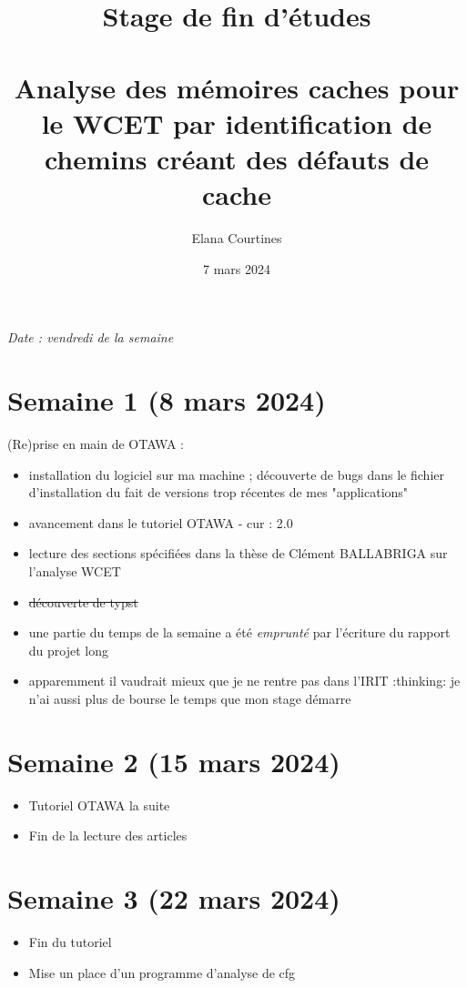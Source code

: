\documentclass[a4paper,12pt]{article}
\title{Stage de fin d'études\\ \vspace*{20mm} \scalebox{2}{Rapport d'avancement}\\ \vspace*{20mm} Analyse des mémoires caches pour le WCET par identification de chemins créant des défauts de cache}
\author{Elana Courtines}
\date{7 mars 2024}
\begin{document}
\maketitle

\textit{Date : vendredi de la semaine}

\section{Semaine 1 (8 mars 2024)}

(Re)prise en main de OTAWA :

\begin{itemize}
  \item installation du logiciel sur ma machine ; découverte de bugs dans le fichier d'installation du fait de versions trop récentes de mes "applications"
  \item avancement dans le tutoriel OTAWA - cur : 2.0
  \item lecture des sections spécifiées dans la thèse de Clément BALLABRIGA sur l'analyse WCET
  \item \sout{découverte de typst}
  \item une partie du temps de la semaine a été \textit{emprunté} par l'écriture du rapport du projet long
  \item apparemment il vaudrait mieux que je ne rentre pas dans l'IRIT :thinking: je n'ai aussi plus de bourse le temps que mon stage démarre 
\end{itemize}


\section{Semaine 2 (15 mars 2024)}


\begin{itemize}
  \item Tutoriel OTAWA la suite
  \item Fin de la lecture des articles
\end{itemize}



\section{Semaine 3 (22 mars 2024)}

\begin{itemize}
  \item Fin du tutoriel
  \item Mise un place d'un programme d'analyse de cfg
\end{itemize}
\end{document}
